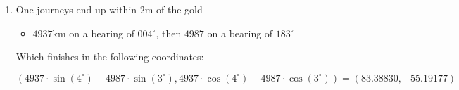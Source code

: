 \documentclass{article}
\begin{document}
\begin{enumerate}
\begin{tikzpicture}[scale=0.5]
\end{tikzpicture}


And thus see that the gold cannot be found via a two step journey

\item One journeys end up within $2$m of the gold

\begin{itemize}
    \item $4937$km on a bearing of $004^\circ$, then $4987$ on a bearing of $183^\circ$
\end{itemize}

Which finishes in the following coordinates:


$$
(4937\cdot \sin(4^\circ) - 4987\cdot \sin(3^\circ), 4937 \cdot\cos(4^\circ) - 4987 \cdot \cos(3^\circ) ) = (83.38830, -55.19177)
$$

\end{enumerate}
\end{document}
